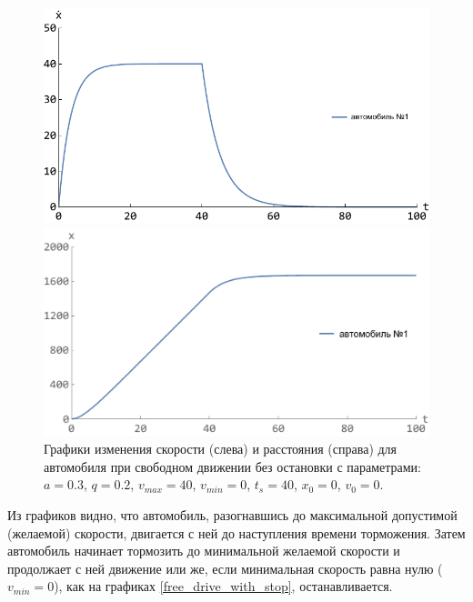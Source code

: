 \documentclass[12pt, a4paper]{extarticle}
\numberwithin{equation}{section}
\numberwithin{figure}{section}
\begin{document}
\begin{figure}[h!]
	\begin{center}
		\begin{minipage}[h!]{0.48\linewidth}
			\includegraphics[width=1\linewidth,height=0.2\textheight]
			{Images/free_drive_speed_with_stop.pdf}
		\end{minipage}
		\hfill 
		\begin{minipage}[h!]{0.48\linewidth}
			\includegraphics[width=1\linewidth,height=0.2\textheight]
			{Images/free_drive_distance_with_stop.pdf}
		\end{minipage}
		\caption{Графики изменения скорости (слева) и расстояния (справа) для автомобиля при свободном движении без остановки с параметрами: $a=0.3$, $q=0.2$, $v_{max}=40$, $v_{min}=0$, $t_s=40$, $x_0=0$, $v_0=0$.}
		\label{free_drive_with_stop}
	\end{center}
\end{figure}

Из графиков видно, что автомобиль, разогнавшись до максимальной допустимой (желаемой) скорости, двигается с ней до наступления времени торможения. Затем автомобиль начинает тормозить до минимальной желаемой скорости и продолжает с ней движение или же, если минимальная скорость равна нулю ($v_{min}=0$), как на графиках \eqref{free_drive_with_stop}, останавливается.
 
\end{document}
